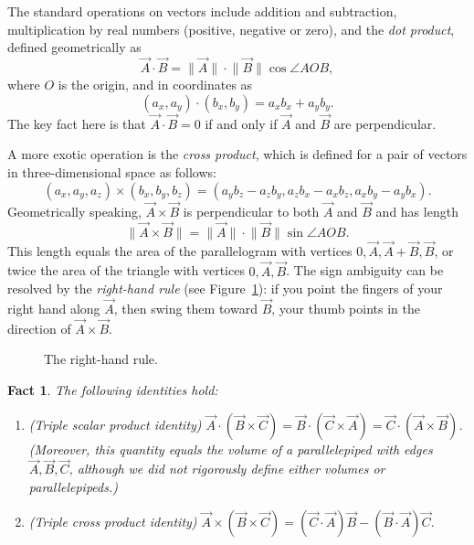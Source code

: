 \documentclass[12pt]{book}
\numberwithin{exc}{section}
\numberwithin{figure}{section}
\newtheorem{fact}[theorem]{Fact}
\numberwithin{equation}{theorem}
\def\ii{\item}
\def\vA{\vec{A}}
\def\vB{\vec{B}}
\def\vC{\vec{C}}
\def\norm#1{\lVert #1 \rVert}
\begin{document}
The standard operations on vectors include addition and subtraction, 
multiplication by real numbers (positive, negative or zero), and the 
\emph{dot product},  defined geometrically as
\[
\vA \cdot \vB = \norm{\vA} \cdot \norm{\vB} \cos \angle AOB,
\]
where $O$ is the origin, and in coordinates as
\[
(a_{x}, a_{y}) \cdot (b_{x}, b_{y}) = a_{x}b_{x} + a_{y}b_{y}.
\]
The key fact here is that $\vA \cdot \vB = 0$ if and only if $\vA$ 
and $\vB$ are perpendicular.

A more exotic operation is the \emph{cross product},  which is defined 
for a pair of vectors in three-dimensional space as follows:
\[
(a_{x}, a_{y}, a_{z}) \times (b_{x}, b_{y}, b_{z}) = (a_{y}b_{z} - 
a_{z}b_{y}, a_{z}b_{x} - a_{x}b_{z}, a_{x}b_{y} - a_{y}b_{x}).
\]
Geometrically speaking, $\vA \times \vB$ is 
perpendicular to both $\vA$ and $\vB$ and has length
\[
\norm{\vA \times \vB} =  \norm{\vA} \cdot \norm{\vB} \sin \angle AOB.
\]
This length equals the area of the parallelogram with vertices $0,
\vA, \vA+\vB, \vB$, or twice the area of the triangle with vertices
$0, \vA, \vB$.
The sign ambiguity can be resolved by the \emph{right-hand 
rule} (see Figure~\ref{fig:righthand}): 
if you point the fingers of your right hand along $\vA$, then 
swing them toward $\vB$, your thumb points in the direction of $\vA 
\times \vB$.
\begin{figure}[ht]
\caption{The right-hand rule.}
\label{fig:righthand}
\end{figure}

\begin{fact}
The following identities hold:
\begin{enumerate}
\ii
(Triple scalar product identity) $\vA \cdot (\vB \times \vC) = \vB
\cdot (\vC \times \vA) = \vC \cdot (\vA \times \vB)$. (Moreover, this
quantity equals the volume of a parallelepiped with edges $\vA, \vB,
\vC$, although we did not rigorously define either volumes or parallelepipeds.)
\ii
(Triple cross product identity) $\vA \times (\vB \times \vC) = (\vC
\cdot \vA) \vB - (\vB \cdot \vA)\vC$.
\end{enumerate}
\end{fact}
\end{document}
